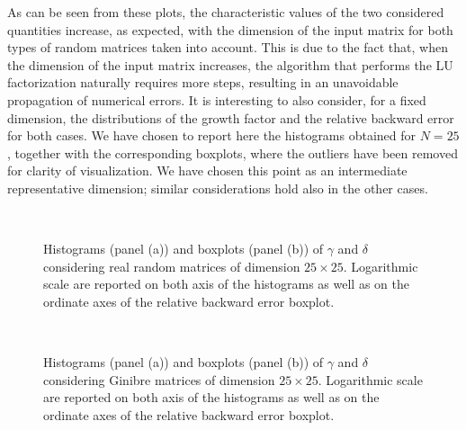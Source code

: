 \documentclass[a4paper,11pt]{report}
\begin{document}
\noindent As can be seen from these plots, the characteristic values of the two considered quantities increase, as expected, with the dimension of the input matrix for both types of random matrices taken into account. This is due to the fact that, when the dimension of the input matrix increases, the algorithm that performs the LU factorization naturally requires more steps, resulting in an unavoidable propagation of numerical errors. It is interesting to also consider, for a fixed dimension, the distributions of the growth factor and the relative backward error for both cases. We have chosen to report here the histograms obtained for $N=25$, together with the corresponding boxplots, where the outliers have been removed for clarity of visualization. We have chosen this point as an intermediate representative dimension; similar considerations hold also in the other cases.
\begin{figure}[H]
	\centering
	\ 
	\caption{Histograms (panel (a)) and boxplots (panel (b)) of $\gamma$ and $\delta$ considering real random matrices of dimension $25\times 25$. Logarithmic scale are reported on both axis of the histograms as well as on the ordinate axes of the relative backward error boxplot.}
	\label{fig:Distributions and boxplot Random Matrices N=25}
\end{figure}

\begin{figure}[H]
	\centering
	\ 
	\caption{Histograms (panel (a)) and boxplots (panel (b)) of $\gamma$ and $\delta$ considering Ginibre matrices of dimension $25\times 25$. Logarithmic scale are reported on both axis of the histograms as well as on the ordinate axes of the relative backward error boxplot.}
	\label{fig:Distributions and boxplot Ginibre Matrices N=25}
\end{figure}
\end{document}
